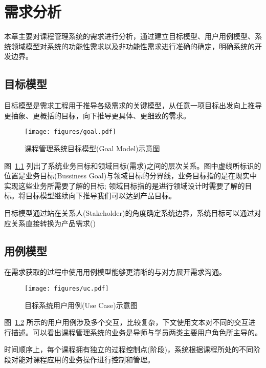 \chapter{需求分析}

本章主要对课程管理系统的需求进行分析，通过建立目标模型、用户用例模型、系统领域模型对系统的功能性需求以及非功能性需求进行准确的确定，明确系统的开发边界。

\section{目标模型}

目标模型是需求工程用于推导各级需求的关键模型，从任意一项目标出发向上推导更抽象、更概括的目标，向下推导更具体、更细致的需求。

\begin{figure}[!h]
  \begin{center}
    \texttt{[image: figures/goal.pdf]}
    \caption{课程管理系统目标模型(Goal Model)示意图\label{GoalModel}}
  \end{center}
\end{figure}

图~\ref{GoalModel} 列出了系统业务目标和领域目标(需求)之间的层次关系。图中虚线所标识的位置是业务目标(Bussiness Goal)与领域目标的分界线，业务目标指的是在现实中实现这些业务所需要了解的目标; 领域目标指的是进行领域设计时需要了解的目标。将目标模型继续向下推导我们可以达到产品目标。

目标模型通过站在关系人(Stakeholder)的角度确定系统边界，系统目标可以通过对应关系直接转换为产品需求()

\section{用例模型}

在需求获取的过程中使用用例模型能够更清晰的与对方展开需求沟通。

\begin{figure}[!h]
  \begin{center}
    \texttt{[image: figures/uc.pdf]}
    \caption{目标系统用户用例(Use Case)示意图\label{UseCase}}
  \end{center}
\end{figure}

图~\ref{UseCase} 所示的用户用例涉及多个交互，比较复杂，下文使用文本对不同的交互进行描述。可以看出课程管理系统的业务是导师与学员两类主要用户角色所主导的。

时间顺序上，每个课程拥有独立的过程控制点(阶段)，系统根据课程所处的不同阶段对能对课程应用的业务操作进行控制和管理。

